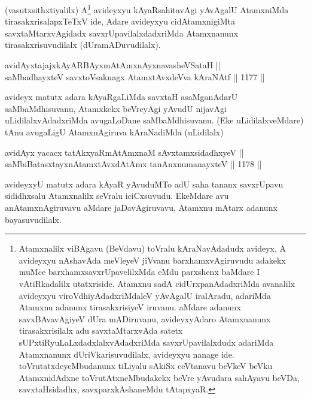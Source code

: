 \begin{artha}
(vasutxsithxtiyalilx) A\footnote{Atamxnalilx viBAgavu (BeVdavu) toVralu kAraNavAdadudx avideyx, A avideyxyu nAshavAda meVleyeV jiVvanu barxhamxvAgiruvudu adakekx muMce barxhamxsavxrUpavelilxMda eMdu parxshenx baMdare I vAtiRkadalilx utatxriside. Atamxnu sadA cidUrxpanAdadxriMda avanalilx avideyxyu viroVdhiyAdadxriMdaleV yAvAgalU iralAradu, adariMda Atamxnu adanunx tirasakxrisiyeV iruvanu. aMdare adanunx savxBAvavAgiyeV dUra mADiruvanu, avideyxyAdaro Atamxnanunx tirasakxrisilalx adu savxtaMtarxvAda satetx sUPxtiRyuLaLxdadxlalxvAdadxriMda savxrUpavilalxdudx adariMda Atamxnanunx dUriVkarisuvudilalx, avideyxyu nanage ide. toVrutatxdeyeMbudanunx tiLiyalu sAkiSx ceVtanavu beVkeV beVku AtamxnidAdxne toVrutAtxneMbudakekx beVre yAvudara sahAyavu beVDa, savxtaHsidadhx, savxparxkAshaneMdu tAtapxyaR.} avideyxyu kAyaRsahitavAgi yAvAgalU AtamxniMda tirasakxrisalapxTeTxV ide, Adare avideyxyu cidAtamxnigiMta savxtaMtarxvAgidadx savxrUpavilalxdadxriMda Atamxnanunx tirasakxrisuvudilalx (dUramADuvudilalx).
\end{artha}


\begin{shl}
avidAyxtajajxkAyARBAyxmAtAmx\s nAyxnavasheVSataH || \\
saMbadhayxteV savxtoV\s saknagx AtamxtAvxdeVva kAraNAtf \hfill || 1177 ||  
\end{shl}

\begin{artha}
avideyx matutx adara kAyaRgaLiMda savxtaH asaMganAdarU saMbaMdhisuvanu, Atamxkekx beVreyAgi yAvudU nijavAgi uLidilalxvAdadxriMda avugaLoDane saMbaMdhisuvanu. (Eke uLidilalxveMdare) tAnu avugaLigU AtamxnAgiruva kAraNadiMda (uLidilalx)
\end{artha}


\begin{shl}
avidAyx yacacx tatAkxyaRmAtAmxnaM sAvxtamxsidadhxyeV ||  \\
saMbiBatasxtayxnAtamxtAvxdAtAmx tanAnxnumanayxteV \hfill || 1178 ||  
\end{shl}

\begin{artha}
avideyxyU matutx adara kAyaR yAvuduMTo adU saha tananx savxrUpavu sididhxsalu Atamxnalilx seVralu iciCxsuvudu. EkeMdare avu anAtamxnAgiruvavu aMdare jaDavAgiruvavu, Atamxnu mAtarx adanunx bayasuvudilalx.
\end{artha}

